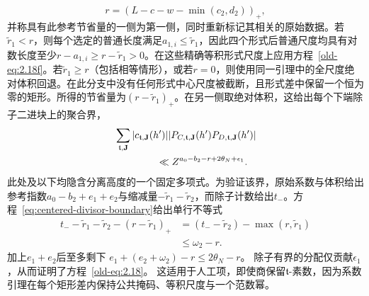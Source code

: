 \documentclass[11pt,a4paper]{article}
\numberwithin{equation}{section}
\numberwithin{figure}{section}
\theoremstyle{definition}
\theoremstyle{remark}
\begin{document}
\[
 r=(L-c-w-\min(c_2,d_2))_+,
\]
并称具有此参考节省量的一侧为第一侧，同时重新标记其相关的原始数据。若\(\widetilde r_1<r\)，则每个选定的普通长度满足\(a_{1,i}\le\widetilde r_1\)，因此四个形式后普通尺度均具有对数长度至少\(r-a_{1,i}\ge r-\widetilde r_1>0\)。在这些精确等积形式尺度上应用方程~\eqref{old-eq:2.18f}。若\(\widetilde r_1\ge r\)（包括相等情形），或若\(r=0\)，则使用同一引理中的全尺度绝对体积回退。在此分支中没有任何形式中心尺度被截断，且形式差中保留一个恒为零的矩形。所得的节省量为\((r-\widetilde r_1)_+\)。在另一侧取绝对体积，这给出每个下端除子二进块上的聚合界，
\begin{equation}
 \begin{split}
 &\sum_{\mathfrak t,\mathbf J}
 |c_{\mathfrak t,\mathbf J}(h')|
 |P_{C,\mathfrak t,\mathbf J}(h')
       P_{D,\mathfrak t,\mathbf J}(h')|\\
 &\hspace{15mm}\ll
 Z^{a_0-b_2-r+2\theta_N+\epsilon_1}.
 \end{split}
 \label{old-eq:2.18}
\end{equation}
此处及以下均隐含分离高度的一个固定多项式。为验证该界，原始系数与体积给出参考指数\(a_0-b_2+e_1+e_2\)与缩减量\(-\widetilde r_1-\widetilde r_2\)，而除子计数给出\(t_-\)。方程~\eqref{eq:centered-divisor-boundary}给出单行不等式
\begin{equation}
 \begin{split}
 t_- -\widetilde r_1-\widetilde r_2-(r-\widetilde r_1)_+
 &=(t_- -\widetilde r_2)-\max(r,\widetilde r_1)\\
 &\le\omega_2-r.
 \end{split}
 \label{old-eq:2.18h}
\end{equation}
加上\(e_1+e_2\)后至多剩下
\(e_1+(e_2+\omega_2)-r\le2\theta_N-r\)。
除子有界的分配仅贡献\(\epsilon_1\)，从而证明了方程~\eqref{old-eq:2.18}。
这适用于人工项，即使商保留\(\mathfrak t\)-素数，因为系数引理在每个矩形差内保持公共掩码、等积尺度与一个范数幂。
\end{document}

